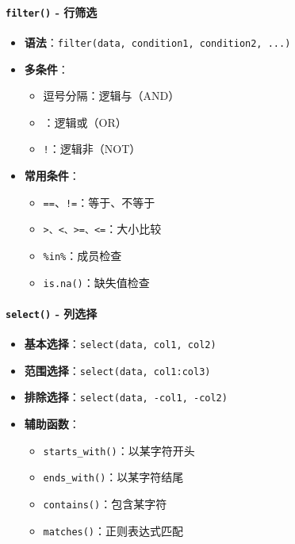 \documentclass[
  twoside]{book}
\providecommand{\tightlist}{%
  \setlength{\itemsep}{0pt}\setlength{\parskip}{0pt}}
\begin{document}
\hypertarget{filter---ux884cux7b5bux9009}{%
\paragraph{\texorpdfstring{\texttt{filter()} - 行筛选}{filter() - 行筛选}}\label{filter---ux884cux7b5bux9009}}

\begin{itemize}
\tightlist
\item
  \textbf{语法}：\texttt{filter(data,\ condition1,\ condition2,\ ...)}
\item
  \textbf{多条件}：

  \begin{itemize}
  \tightlist
  \item
    逗号分隔：逻辑与（AND）
  \item
    \texttt{\textbar{}}：逻辑或（OR）
  \item
    \texttt{!}：逻辑非（NOT）
  \end{itemize}
\item
  \textbf{常用条件}：

  \begin{itemize}
  \tightlist
  \item
    \texttt{==}、\texttt{!=}：等于、不等于
  \item
    \texttt{\textgreater{}、\textless{}、\textgreater{}=、\textless{}=}：大小比较
  \item
    \texttt{\%in\%}：成员检查
  \item
    \texttt{is.na()}：缺失值检查
  \end{itemize}
\end{itemize}

\hypertarget{select---ux5217ux9009ux62e9}{%
\paragraph{\texorpdfstring{\texttt{select()} - 列选择}{select() - 列选择}}\label{select---ux5217ux9009ux62e9}}

\begin{itemize}
\tightlist
\item
  \textbf{基本选择}：\texttt{select(data,\ col1,\ col2)}
\item
  \textbf{范围选择}：\texttt{select(data,\ col1:col3)}
\item
  \textbf{排除选择}：\texttt{select(data,\ -col1,\ -col2)}
\item
  \textbf{辅助函数}：

  \begin{itemize}
  \tightlist
  \item
    \texttt{starts\_with()}：以某字符开头
  \item
    \texttt{ends\_with()}：以某字符结尾
  \item
    \texttt{contains()}：包含某字符
  \item
    \texttt{matches()}：正则表达式匹配
  \end{itemize}
\end{itemize}
\end{document}
